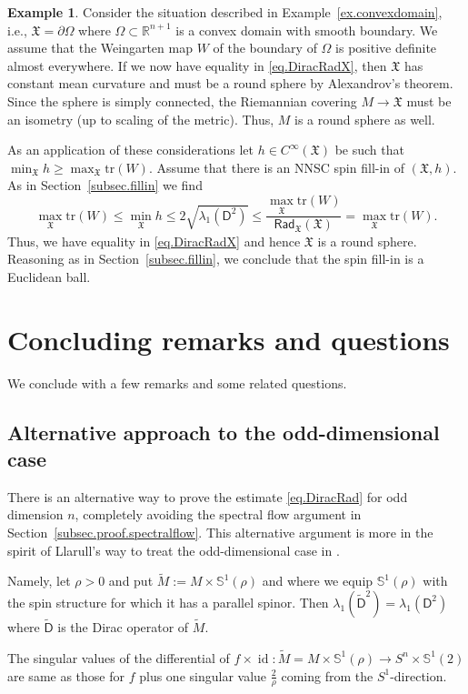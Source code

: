 \documentclass[11pt,reqno]{amsart}
\newcommand{\RadX}{\mathsf{Rad}_{\XX}}
\newcommand{\XX}{\mathfrak{X}}
\newcommand{\tr}{\mathrm{tr}}
\newcommand{\R}{\mathbb{R}}
\newcommand{\D}{\mathsf{D}}
\newcommand{\<}{\langle}
\renewcommand{\>}{\rangle}
\DeclareMathOperator{\id}{\mathrm{id}}
\theoremstyle{definition}
\newtheorem{example}{Example}
\begin{document}
\begin{example}
Consider the situation described in Example~\ref{ex.convexdomain}, i.e., $\XX=\partial\Omega$ where $\Omega\subset\R^{n+1}$ is a convex domain with smooth boundary. 
We assume that the Weingarten map $W$ of the boundary of $\Omega$ is positive definite almost everywhere.
If we now have equality in \eqref{eq.DiracRadX}, then $\XX$ has constant mean curvature and must be a round sphere by Alexandrov's theorem.
Since the sphere is simply connected, the Riemannian covering $M\to\XX$ must be an isometry (up to scaling of the metric).
Thus, $M$ is a round sphere as well.

As an application of these considerations let $h\in C^\infty(\XX)$ be such that $\min_\XX h \ge \max_\XX \tr(W)$.
Assume that there is an NNSC spin fill-in of $(\XX,h)$.
As in Section~\ref{subsec.fillin} we find
$$
\max_\XX \tr(W) \le \min_\XX h \le 2\sqrt{\lambda_1(\D^2)}\le \frac{\max_\XX\tr(W)}{\RadX(\XX)} = \max_\XX \tr(W).
$$
Thus, we have equality in \eqref{eq.DiracRadX} and hence $\XX$ is a round sphere.
Reasoning as in Section~\ref{subsec.fillin}, we conclude that the spin fill-in is a Euclidean ball.
\end{example}



\section{Concluding remarks and questions}
\label{sec.conclusion}

We conclude with a few remarks and some related questions.

\subsection{Alternative approach to the odd-dimensional case}
There is an alternative way to prove the estimate \eqref{eq.DiracRad} for odd dimension $n$, completely avoiding the spectral flow argument in Section~\ref{subsec.proof.spectralflow}.
This alternative argument is more in the spirit of Llarull's way to treat the odd-dimensional case in \cite{Ll}.

Namely, let $\rho>0$ and put $\tilde{M} :=M\times \mathbb{S}^1(\rho)$ and where we equip $\mathbb{S}^1(\rho)$ with the spin structure for which it has a parallel spinor.
Then $\lambda_1(\tilde{\D}^2)=\lambda_1(\D^2)$ where $\tilde{\D}$ is the Dirac operator of $\tilde{M}$.

The singular values of the differential of $f\times \id\colon \tilde{M} =M\times \mathbb{S}^1(\rho) \to S^n\times \mathbb{S}^1(2)$ are same as those for $f$ plus one singular value $\frac{2}{\rho}$ coming from the $S^1$-direction.
\end{document}

